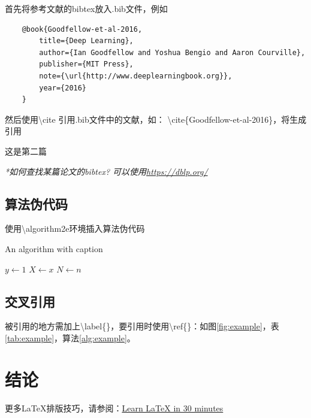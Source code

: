 \documentclass[hyperref,a4paper,UTF8]{ctexart}
\begin{document}
首先将参考文献的bibtex放入.bib文件，例如
\begin{verbatim}
    @book{Goodfellow-et-al-2016,
        title={Deep Learning},
        author={Ian Goodfellow and Yoshua Bengio and Aaron Courville},
        publisher={MIT Press},
        note={\url{http://www.deeplearningbook.org}},
        year={2016}
    }
\end{verbatim}



然后使用\textbackslash cite 引用.bib文件中的文献，如：
\textbackslash cite\{Goodfellow-et-al-2016\}，将生成引用 \cite{Goodfellow-et-al-2016}

这是第二篇 \cite{DBLP:conf/alt/ChakrabartyL23}

\textit{*如何查找某篇论文的bibtex? 可以使用\url{https://dblp.org/}}

\subsection{算法伪代码}

使用\textbackslash algorithm2e环境插入算法伪代码


{}

\begin{algorithm}[h]
    \caption{An algorithm with caption}\label{alg:example}
    $y \gets 1$\;
    $X \gets x$\;
    $N \gets n$\;
\end{algorithm}


\subsection{交叉引用}
被引用的地方需加上\textbackslash label\{\}，要引用时使用\textbackslash ref\{\}：如图\ref{fig:example}，表\ref{tab:example}，算法\ref{alg:example}。


\section{结论}

更多\LaTeX 排版技巧，请参阅：\href{https://www.overleaf.com/learn/latex/Learn_LaTeX_in_30_minutes}{Learn LaTeX in 30 minutes}



\newpage


\end{document}
